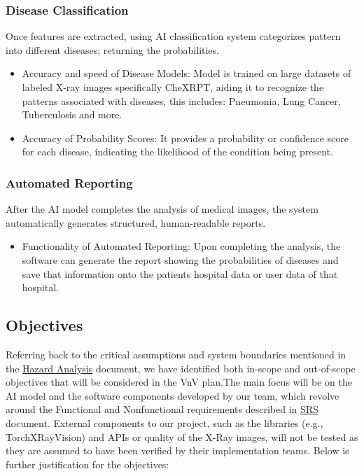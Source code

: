\documentclass[12pt, titlepage]{article}
\newcommand{\srsurl}{https://github.com/RezaJodeiri/CXR-Capstone/blob/main/docs/SRS/SRS.pdf}
\begin{document}
\subsubsection{Disease Classification}
Once features are extracted, using AI classification system categorizes pattern  into different diseases; returning the probabilities.
    \begin{itemize}
        \item[-] Accuracy and speed of Disease Models: Model is trained on large datasets of labeled X-ray images specifically CheXRPT, aiding it to recognize the patterns associated with diseases, this includes: Pneumonia, Lung Cancer, Tuberculosis and more.
        \item[-] Accuracy  of Probability Scores: It provides a probability or confidence score for each disease, indicating the likelihood of the condition being present.
    \end{itemize}
\subsubsection{Automated Reporting}
After the AI model completes the analysis of medical images, the system automatically generates structured, human-readable reports.
    \begin{itemize}
            \item[-] Functionality of Automated Reporting: Upon completing the analysis, the software can generate the report showing the probabilities of diseases and save that information onto the patients hospital data or user data of that hospital.
    \end{itemize}
    \subsection{Objectives}

    Referring back to the critical assumptions and system boundaries mentioned in the \href{https://github.com/RezaJodeiri/CXR-Capstone/blob/main/docs/HazardAnalysis/HazardAnalysis.pdf}{Hazard Analysis} \citep{HA}
    document, we have identified both in-scope and out-of-scope objectives that will be considered in the VnV plan.The main focus will be on the AI model and the software components developed by our team, which revolve around the Functional and Nonfunctional requirements described in \href{\srsurl}{SRS} \citep{SRS}
    document. External components to our project, such as the libraries (e.g., TorchXRayVision) and APIs or quality of the X-Ray images, will not be tested as they are assumed to have been verified by their implementation teams. Below is further justification for the objectives:
    
\end{document}
